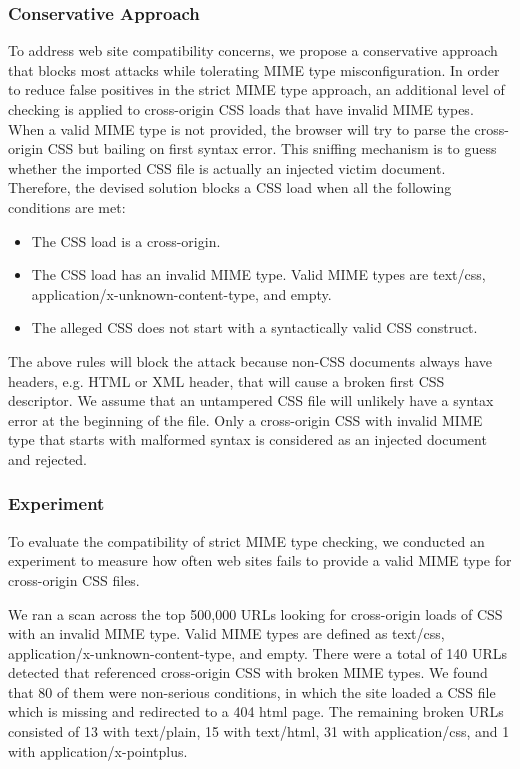 \documentclass{acm_proc_article-sp}
\begin{document}
{\subsubsection{Conservative Approach}
To address web site compatibility concerns, we propose a conservative approach that blocks most attacks while tolerating MIME type misconfiguration. In order to reduce false positives in the strict MIME type approach, an additional level of checking is applied to cross-origin CSS loads that have invalid MIME types. When a valid MIME type is not provided, the browser will try to parse the cross-origin CSS but bailing on first syntax error. This sniffing mechanism is to guess whether the imported CSS file is actually an injected victim document. Therefore, the devised solution blocks a CSS load when all the following conditions are met:
\begin{itemize}
\item{The CSS load is a cross-origin.}
\item{The CSS load has an invalid MIME type. Valid MIME types are text/css, application/x-unknown-content-type, and empty.}
\item{The alleged CSS does not start with a syntactically valid CSS construct.}
\end{itemize}
The above rules will block the attack because non-CSS documents always have headers, e.g. HTML or XML header, that will cause a broken first CSS descriptor. We assume that an untampered CSS file will unlikely have a syntax error at the beginning of the file. Only a cross-origin CSS with invalid MIME type that starts with malformed syntax is considered as an injected document and rejected.

\subsubsection{Experiment}
To evaluate the compatibility of strict MIME type checking, we conducted an experiment to measure how often web sites fails to provide a valid MIME type for cross-origin CSS files.

We ran a scan across the top 500,000 URLs looking for cross-origin loads of CSS with an invalid MIME type. Valid MIME types are defined as text/css, application/x-unknown-content-type, and empty. There were a total of 140 URLs detected that referenced cross-origin CSS with broken MIME types. We found that 80 of them were non-serious conditions, in which the site loaded a CSS file which is missing and redirected to a 404 html page. The remaining broken URLs consisted of 13 with text/plain, 15 with text/html, 31 with application/css, and 1 with application/x-pointplus.

}
\end{document}
